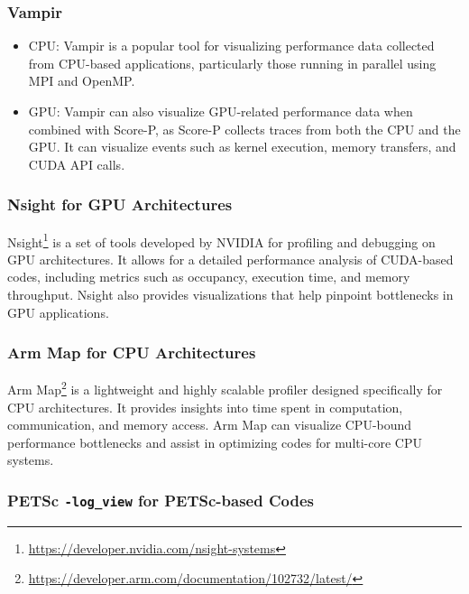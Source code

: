 \subsubsection{Vampir}
\label{sec:methodology-tools-vampir}

\begin{itemize}
    \item CPU: Vampir is a popular tool for visualizing performance data collected from CPU-based applications, particularly those running in parallel using MPI and OpenMP.
    \item GPU: Vampir can also visualize GPU-related performance data when combined with Score-P, as Score-P collects traces from both the CPU and the GPU. It can visualize events such as kernel execution, memory transfers, and CUDA API calls.
\end{itemize}


\subsubsection{Nsight for GPU Architectures}
\label{sec:methodology-tools-nsight}

Nsight\footnote{\url{https://developer.nvidia.com/nsight-systems}} is a set of tools developed by NVIDIA for profiling and debugging on GPU architectures. 
It allows for a detailed performance analysis of CUDA-based codes, including metrics such as occupancy, execution time, and memory throughput.
Nsight also provides visualizations that help pinpoint bottlenecks in GPU applications.

\subsubsection{Arm Map for CPU Architectures}
\label{sec:methodology-tools-armmap}

Arm Map\footnote{\url{https://developer.arm.com/documentation/102732/latest/}} is a lightweight and highly scalable profiler designed specifically for CPU architectures. 
It provides insights into time spent in computation, communication, and memory access. 
Arm Map can visualize CPU-bound performance bottlenecks and assist in optimizing codes for multi-core CPU systems.

\subsubsection{PETSc \texttt{-log\_view} for PETSc-based Codes}
\label{sec:methodology-tools-petsc}

